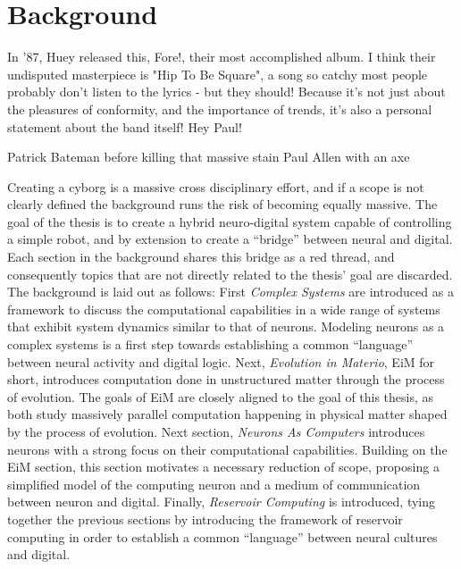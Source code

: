 \chapter{Background}
\epigraph{
In '87, Huey released this, Fore!, their most accomplished album. I think their undisputed masterpiece is "Hip To Be Square", a song so catchy most people probably don't listen to the lyrics - but they should! Because it's not just about the pleasures of conformity, and the importance of trends, it's also a personal statement about the band itself! Hey Paul!
}{Patrick Bateman before killing that massive stain Paul Allen with an axe}
Creating a cyborg is a massive cross disciplinary effort, and if a scope is not
clearly defined the background runs the risk of becoming equally massive.
The goal of the thesis is to create a hybrid neuro-digital system capable of
controlling a simple robot, and by extension to create a ``bridge'' between
neural and digital.
Each section in the background shares this bridge as a red thread, and
consequently topics that are not directly related to the thesis' goal are discarded.
The background is laid out as follows:
First \emph{Complex Systems} are introduced as a framework to discuss the computational
capabilities in a wide range of systems that exhibit system dynamics similar to
that of neurons.
Modeling neurons as a complex systems is a first step towards establishing a
common ``language'' between neural activity and digital logic.
%
Next, \emph{Evolution in Materio}, EiM for short, introduces computation done in
unstructured matter through the process of evolution.
The goals of EiM are closely aligned to the goal of this thesis, as both study
massively parallel computation happening in physical matter shaped by the
process of evolution.
%
Next section, \emph{Neurons As Computers} introduces neurons with a strong focus
on their computational capabilities.
Building on the EiM section, this section motivates a necessary reduction of
scope, proposing a simplified model of the computing neuron and a medium of
communication between neuron and digital.
%
Finally, \emph{Reservoir Computing} is introduced, tying together the previous
sections by introducing the framework of reservoir computing in order to
establish a common ``language'' between neural cultures and digital.
